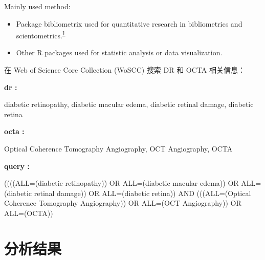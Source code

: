 \documentclass[
]{article}
\providecommand{\tightlist}{%
  \setlength{\itemsep}{0pt}\setlength{\parskip}{0pt}}
\begin{document}
Mainly used method:

\begin{itemize}
\tightlist
\item
  Package bibliometrix used for quantitative research in bibliometrics and scientometrics.\textsuperscript{\protect\hyperlink{ref-BibliometrixAria2017}{1}}
\item
  Other R packages used for statistic analysis or data visualization.
\end{itemize}

在 Web of Science Core Collection (WoSCC) 搜索 DR 和 OCTA 相关信息：

\begin{center}\begin{tcolorbox}[colback=gray!10, colframe=gray!50, width=0.9\linewidth, arc=1mm, boxrule=0.5pt]
\textbf{
dr
:}

\vspace{0.5em}

    diabetic retinopathy, diabetic macular edema, diabetic
retinal damage, diabetic retina

\vspace{2em}


\textbf{
octa
:}

\vspace{0.5em}

    Optical Coherence Tomography Angiography, OCT
Angiography, OCTA

\vspace{2em}


\textbf{
query
:}

\vspace{0.5em}

    ((((ALL=(diabetic retinopathy)) OR ALL=(diabetic
macular edema)) OR ALL=(diabetic retinal damage)) OR
ALL=(diabetic retina)) AND (((ALL=(Optical Coherence
Tomography Angiography)) OR ALL=(OCT Angiography)) OR
ALL=(OCTA))

\vspace{2em}
\end{tcolorbox}
\end{center}

\hypertarget{results}{%
\section{分析结果}\label{results}}
\end{document}
